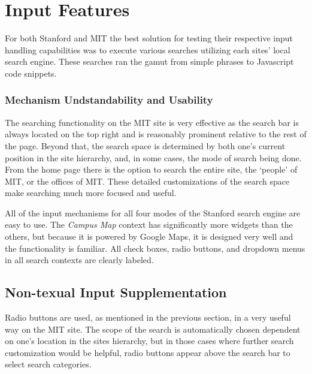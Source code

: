 \section*{Input Features}

For both Stanford and MIT the best solution for testing their respective input handling capabilities was to execute
various searches utilizing each sites' local search engine. These searches ran the gamut from simple phrases to
Javascript code snippets.

\subsubsection*{Mechanism Undstandability and Usability}

            The searching functionality on the MIT site is very effective as the search
            bar is always located on the top right and is reasonably prominent relative
            to the rest of the page. Beyond that, the search space is determined by both
            one's current position in the site hierarchy, and, in some cases, the mode
            of search being done. From the home page there is the option to search the
            entire site, the `people' of MIT, or the offices of MIT. These detailed
            customizations of the search space make searching much more focused and useful.

            All of the input mechanisms for all four modes of the Stanford search
            engine are easy to use. The \textsl{Campus Map} context has significantly
            more widgets than the others, but because it is powered by Google Maps,
            it is designed very well and the functionality is familiar. All
            check boxes, radio buttons, and dropdown menus in all search contexts
            are clearly labeled.

\subsection*{Non-texual Input Supplementation}

            Radio buttons are used, as mentioned in the previous section, in a very useful
            way on the MIT site. The scope of the search is automatically chosen dependent
            on one's location in the sites hierarchy, but in those cases where further search
            customization would be helpful, radio buttons appear above the search bar to select
            search categories.

